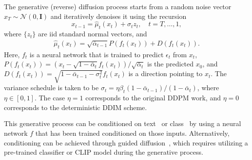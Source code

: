 The generative (reverse) diffusion process starts from a random noise vector $x_T \sim \mathcal{N}(0,\mathbf{I})$ and iteratively denoises it using the recursion %
\begin{equation}
\label{eq:diffusion}
    x_{t-1} = \hat\mu_t(x_t) + \sigma_t z_t,\quad t=T,\ldots,1,
\end{equation}
where $\{z_t\}$ are iid standard normal vectors, and%
\begin{align}
\label{eq:PD}
\hat\mu_t(x_t) = 
\sqrt{\bar \alpha_{t-1}} P(f_t(x_t)) + D(f_t(x_t)).
\end{align}
Here, $f_t$ is a neural network that is trained to predict  $\epsilon_t$ from $x_t$, $P(f_t(x_t))=(x_t-\sqrt{1-\bar \alpha_{t}}f_t(x_t))/\sqrt{\bar \alpha_{t}}$ is the predicted $x_0$, and $D(f_t(x_t))=\sqrt{1-\bar \alpha_{t-1}-\sigma_t^2} f_t(x_t)$ is a direction pointing to $x_t$. 
The variance schedule is taken to be $\sigma_t=\eta \beta_t (1-\bar{\alpha}_{t-1})/(1-\bar{\alpha}_t)$, where $\eta\in[0,1]$.
The case $\eta=1$ corresponds to the original DDPM work, and $\eta= 0$ corresponds to the deterministic DDIM scheme.

This generative process can be conditioned on text~\cite{Rombach22} or class~\cite{Ho21} by using a neural network $f$ that has been trained conditioned on those inputs. Alternatively, conditioning can be achieved through guided diffusion~\cite{Prafulla21,avrahami22}, which requires utilizing a pre-trained classifier or CLIP model during the generative process.






